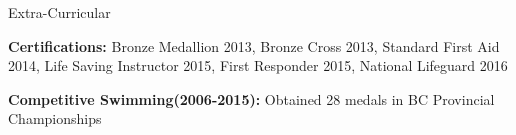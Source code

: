 \documentclass{resume} %
\begin{document}

\begin{rSection}{Extra-Curricular} \itemsep -3pt
\item \textbf{Certifications: } Bronze Medallion 2013, Bronze Cross 2013, Standard First Aid 2014, Life Saving Instructor 2015, First Responder 2015, National Lifeguard 2016
\item \textbf{Competitive Swimming(2006-2015):} Obtained 28 medals in BC Provincial Championships


\end{rSection}
\end{document}
